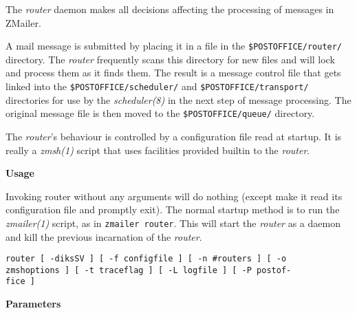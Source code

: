 

The {\em router\/} daemon makes all decisions affecting 
the processing of messages in ZMailer.

A mail message is submitted by placing it in a file in the
{\tt \$POSTOFFICE/router/} directory. The 
{\em router\/} frequently scans this directory for new 
files and will lock and process them as it finds them. 
The result is a message control file that gets linked into 
the {\tt \$POSTOFFICE/scheduler/} and 
{\tt \$POSTOFFICE/transport/} directories for use 
by the {\em scheduler(8)\/} in the next step of message 
processing. The original message file is then moved to the 
{\tt \$POSTOFFICE/queue/} directory. 

The {\em router\/}'s behaviour is controlled by a 
configuration file read at startup. It is really a 
{\em zmsh(1)\/} script that uses facilities provided 
builtin to the {\em router\/}. 

{\bf Usage}

Invoking router without any arguments will do nothing
(except make it read its configuration file and promptly
exit). The normal startup method is to run the {\em zmailer(1)\/} 
script, as in {\tt zmailer router}. This will start the 
{\em router\/} as a daemon and  kill the previous 
incarnation of the {\em router\/}. 

\begin{verbatim}
router [ -diksSV ] [ -f configfile ] [ -n #routers ] [ -o 
zmshoptions ] [ -t traceflag ] [ -L logfile ] [ -P postof-
fice ] 
\end{verbatim}
 

{\bf Parameters}

